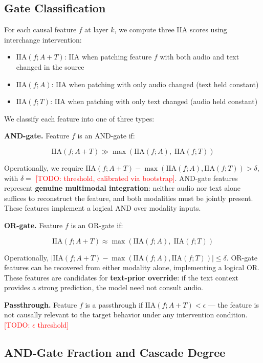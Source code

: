 \documentclass[a4paper]{article}
\begin{document}
\subsection{Gate Classification}

For each causal feature $f$ at layer $k$, we compute three IIA scores using interchange intervention:

\begin{itemize}
\item $\text{IIA}(f; A{+}T)$: IIA when patching feature $f$ with both audio and text changed in the source
\item $\text{IIA}(f; A)$: IIA when patching with only audio changed (text held constant)
\item $\text{IIA}(f; T)$: IIA when patching with only text changed (audio held constant)
\end{itemize}

We classify each feature into one of three types:

\textbf{AND-gate.} Feature $f$ is an AND-gate if:

\[\text{IIA}(f; A{+}T) \gg \max\left(\text{IIA}(f; A),\; \text{IIA}(f; T)\right)\]

Operationally, we require $\text{IIA}(f; A{+}T) - \max(\text{IIA}(f; A), \text{IIA}(f; T)) > \delta$, with $\delta = $ \textcolor{red}{[TODO: threshold, calibrated via bootstrap]}. AND-gate features represent \textbf{genuine multimodal integration}: neither audio nor text alone suffices to reconstruct the feature, and both modalities must be jointly present. These features implement a logical AND over modality inputs.

\textbf{OR-gate.} Feature $f$ is an OR-gate if:

\[\text{IIA}(f; A{+}T) \approx \max\left(\text{IIA}(f; A),\; \text{IIA}(f; T)\right)\]

Operationally, $|\text{IIA}(f; A{+}T) - \max(\text{IIA}(f; A), \text{IIA}(f; T))| \leq \delta$. OR-gate features can be recovered from either modality alone, implementing a logical OR. These features are candidates for \textbf{text-prior override}: if the text context provides a strong prediction, the model need not consult audio.

\textbf{Passthrough.} Feature $f$ is a passthrough if $\text{IIA}(f; A{+}T) < \epsilon$ — the feature is not causally relevant to the target behavior under any intervention condition. \textcolor{red}{[TODO: $\epsilon$ threshold]}

\subsection{AND-Gate Fraction and Cascade Degree}
\end{document}
